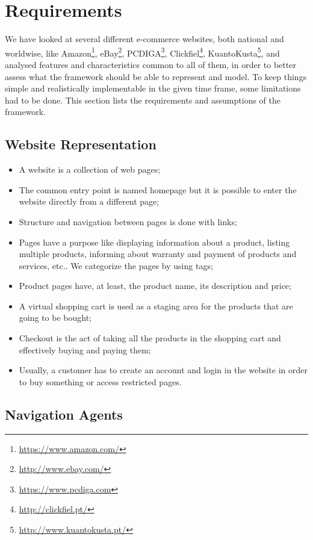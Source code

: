 \section{Requirements}

We have looked at several different e-commerce websites, both national and 
worldwise, like Amazon\footnote{\url{https://www.amazon.com/}}, 
eBay\footnote{\url{http://www.ebay.com/}}, 
PCDIGA\footnote{\url{https://www.pcdiga.com}}, 
Clickfiel\footnote{\url{http://clickfiel.pt/}}, 
KuantoKusta\footnote{\url{http://www.kuantokusta.pt/}}, and analysed features 
and characteristics common to all of them, in order to better assess what the 
framework should be able to represent and model. To keep things simple and 
realistically implementable in the given time frame, some limitations had to be 
done. This section lists the requirements and assumptions of the framework.

\subsection{Website Representation}

\begin{itemize}
    \item A website is a collection of web pages;
    \item The common entry point is named homepage but it is possible to enter 
    the website directly from a different page;
    \item Structure and navigation between pages is done with links;
    \item Pages have a purpose like displaying information about a 
    product, listing multiple products, informing about warranty and payment of 
    products and services, etc.. We categorize the pages by using tags;
    \item Product pages have, at least, the product name, its description and 
    price;
    \item A virtual shopping cart is used as a staging area for the products 
    that are going to be bought;
    \item Checkout is the act of taking all the products in the shopping cart 
    and effectively buying and paying them;
    \item Usually, a customer has to create an account and login in the website 
    in order to buy something or access restricted pages.
\end{itemize}

\subsection{Navigation Agents}

